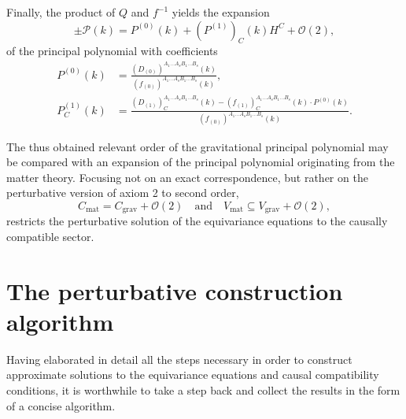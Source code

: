 Finally, the product of $Q$ and $f^{-1}$ yields the expansion
\begin{equation}
  \pm \mathcal P(k) = P^{(0)}(k) + (P^{(1)})_C(k) H^C + \mathcal O(2),
\end{equation}
of the principal polynomial with coefficients
\begin{equation}\label{expansion_coefficients_poly}
  \begin{aligned}
    P^{(0)}(k) &{} = \frac{(D_{(0)})^{A_1\dots A_sB_1\dots B_s}(k)}{(f_{(0)})^{A_1\dots A_sB_1\dots B_s}(k)}, \\
    P^{(1)}_C(k) &{} = \frac{(D_{(1)})^{A_1\dots A_sB_1\dots B_s}_C(k) - (f_{(1)})^{A_1\dots A_sB_1\dots B_s}_C(k) \cdot P^{(0)}(k)}{(f_{(0)})^{A_1\dots A_sB_1\dots B_s}(k)}.
  \end{aligned}
\end{equation}

The thus obtained relevant order of the gravitational principal polynomial may be compared with an expansion of the principal polynomial originating from the matter theory. Focusing not on an exact correspondence, but rather on the perturbative version of axiom 2 to second order,
\begin{equation}
  C_\text{mat} = C_\text{grav} + \mathcal O(2) \quad\text{and}\quad V_\text{mat} \subseteq V_\text{grav} + \mathcal O(2),
\end{equation}
restricts the perturbative solution of the equivariance equations to the causally compatible sector.

\section{The perturbative construction algorithm}

Having elaborated in detail all the steps necessary in order to construct approximate solutions to the equivariance equations and causal compatibility conditions, it is worthwhile to take a step back and collect the results in the form of a concise algorithm.

